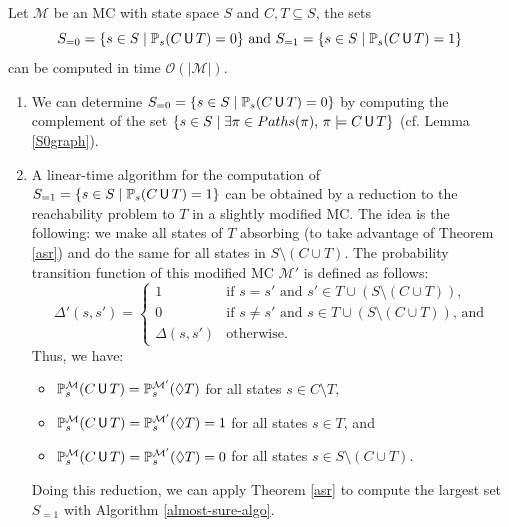 \begin{corollary}\label{qualitative-const-reach} Let $\mathcal{M}$ be an MC with state space $S$ and $C, T \subseteq S$, the sets
\[
  S_{=0} = \{ s \in S \; | \; \mathbb{P}_s (C \,\text{\sffamily U}\, T) = 0 \} \text{ and } S_{=1} = \{ s \in S \; | \; \mathbb{P}_s (C \,\text{\sffamily U}\, T ) = 1 \}
  \]
  can be computed in time $\mathcal{O}(|\mathcal{M}|)$.
\end{corollary}
\begin{proof2}\cite{PMC}
\begin{enumerate}
  \item We can determine $S_{=0}=\{s \in S \; | \; \mathbb{P}_s(C \,\text{\sffamily U}\, T)=0\}$ by computing the complement of the set $\{s \in S \; | \; \exists \pi \in Paths(\pi), \, \pi \models C \,\text{\sffamily U}\, T \}$ (cf. Lemma \ref{S0graph}).
  \item A linear-time algorithm for the computation of $S_{=1}=\{ s\in S \; | \; \mathbb{P}_s(C \,\text{\sffamily U}\, T) = 1 \}$ can be obtained by a reduction to the reachability problem to $T$ in a slightly modified MC. The idea is the following: we make all states of $T$ absorbing (to take advantage of Theorem \ref{asr}) and do the same for all states in $S \setminus (C \cup T)$.
  The probability transition function of this modified MC $\mathcal{M}'$ is
  defined as follows:
  \[
    \Delta'(s, s') = \begin{cases}
      1 & \text{if } s=s' \text{ and } s'\in T \cup (S \setminus(C \cup T)),\\
      0 & \text{if } s \neq s' \text{ and } s \in T \cup (S \setminus (C \cup T)),\, \text{and}\\
      \Delta(s, s') & \text{otherwise}.
    \end{cases}
  \]
  Thus, we have:
  \begin{itemize}
    \item $\mathbb{P}_s^\mathcal{M}(C \,\text{\sffamily U}\, T) = \mathbb{P}_s^\mathcal{M'}(\Diamond T)$ for all states $s \in C \setminus T$,
    \item $\mathbb{P}_s^\mathcal{M}(C \,\text{\sffamily U}\, T) = \mathbb{P}_s^{\mathcal{M}'}(\Diamond T) = 1$
    for all states $s \in T$, and
    \item $\mathbb{P}_s^\mathcal{M}(C \,\text{\sffamily U}\, T)= \mathbb{P}_s^{\mathcal{M}'}(\Diamond T) = 0$ for all states $s \in S \setminus (C \cup T)$.
  \end{itemize}
  Doing this reduction, we can apply Theorem  \ref{asr} to compute the largest set $S_{=1}$ with Algorithm \ref{almost-sure-algo}.
\end{enumerate}
\end{proof2}\\

